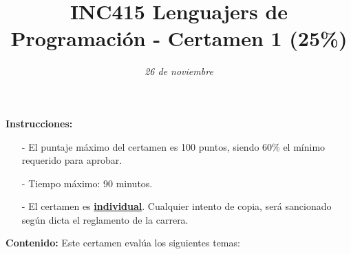 \documentclass{exam}
\title{\LARGE\color{azul}\textbf{INC415 Lenguajers de Programaci\'on - Certamen 1 (25\%)}}
\author{\normalsize \color{gray}{Prof.} \color{black}{\textbf{Rodrigo Olivares}}}
\date{\normalsize \em 26 de noviembre}
\begin{document}

\maketitle

\vspace*{-7mm}
\noindent
\textbf{Instrucciones:} 
\begin{itemize}
    \item[-] El puntaje m\'aximo del certamen es 100 puntos, siendo 60\% el m\'inimo requerido para aprobar.
    \item[-] Tiempo m\'aximo: 90 minutos.
    \item[-] El certamen es \underline{\textbf{individual}}. Cualquier intento de copia, ser\'a sancionado seg\'un dicta el reglamento de la carrera.
\end{itemize}


\noindent
\textbf{Contenido:} Este certamen eval\'ua los siguientes temas:
\end{document}
